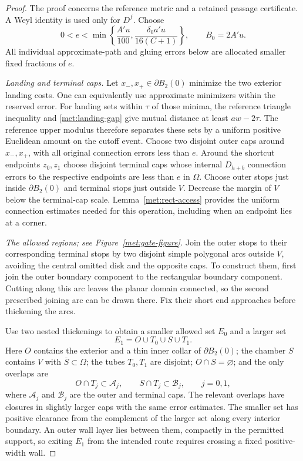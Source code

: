 \begin{proof}
The proof concerns the reference metric and a retained passage
certificate.  A Weyl identity is used only for $D^f$.
Choose
\[
 0<e<\min\left\{\frac{A'u}{100},
                    \frac{\delta_0a'u}{16(C+1)}\right\},
 \qquad B_0=2A'u.
\]
All individual approximate-path and gluing errors below are allocated
smaller fixed fractions of $e$.

\emph{Landing and terminal caps.}
Let $x_-,x_+\in\partial B_2(0)$ minimize the two exterior landing
costs.  One can equivalently use approximate minimizers within the
reserved error.  For landing sets within $\tau$ of those minima,
the reference triangle inequality and
\eqref{met:landing-gap} give mutual distance at least $aw-2\tau$.
The reference upper modulus therefore separates these sets by a
uniform positive Euclidean amount on the cutoff event.
Choose two disjoint outer caps around $x_-,x_+$, with all original
connection errors less than $e$.  Around the shortcut endpoints
$z_0,z_1$ choose disjoint terminal caps whose internal $D_{h+b}$
connection errors to the respective endpoints are less than $e$ in
$\Omega$.  Choose outer stops just inside $\partial B_2(0)$ and
terminal stops just outside $V$.  Decrease the margin of $V$ below the
terminal-cap scale.  Lemma~\ref{met:rect-access} provides the uniform
connection estimates needed for this operation, including when an
endpoint lies at a corner.

\emph{The allowed regions; see Figure~\ref{met:gate-figure}.}
Join the outer stops to their corresponding terminal stops by two
disjoint simple polygonal arcs outside $V$, avoiding the central
omitted disk and the opposite caps.  To construct them, first join
the outer boundary component to the rectangular boundary component.
Cutting along this arc leaves the planar domain connected, so the
second prescribed joining arc can be drawn there.  Fix their short
end approaches before thickening the arcs.

Use two nested thickenings to obtain a smaller allowed set $E_0$ and
a larger set
\[
 E_1=O\cup T_0\cup S\cup T_1.
\]
Here $O$ contains the exterior and a thin inner collar of
$\partial B_2(0)$; the chamber $S$ contains $V$ with
$\overline S\subset\Omega$; the tubes $T_0,T_1$ are disjoint;
$O\cap S=\varnothing$; and the only overlaps are
\[
 O\cap T_j\subset\mathcal A_j,
 \qquad S\cap T_j\subset\mathcal B_j,
 \qquad j=0,1,
\]
where $\mathcal A_j$ and $\mathcal B_j$ are the outer and terminal
caps.  The relevant overlaps have closures in slightly larger caps
with the same error estimates.  The smaller set has positive
clearance from the complement of the larger set along every interior
boundary.  An outer wall layer lies between them, compactly in the
permitted support, so exiting $E_1$ from the intended route requires
crossing a fixed positive-width wall.


\end{proof}
